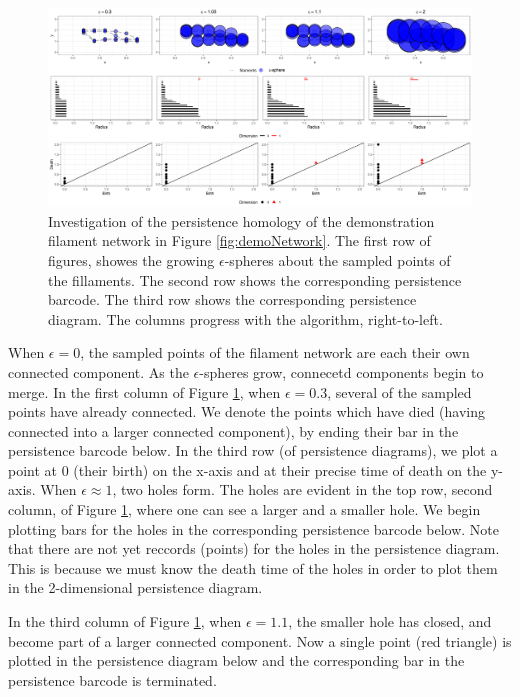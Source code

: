 \documentclass[10pt]{article}
\begin{document}
\begin{figure}[H]
	\begin{center}
		\includegraphics[width=1\textwidth]{figures/filaments_rips.png}
	\end{center}
	\caption{Investigation of the persistence homology of the demonstration filament network in Figure \ref{fig:demoNetwork}. The first row of figures, showes the growing $\epsilon$-spheres about the sampled points of the fillaments. The second row shows the corresponding persistence barcode. The third row shows the corresponding persistence diagram. The columns progress with the algorithm, right-to-left.}
	\label{fig:persistencediagram}
\end{figure}

When $\epsilon=0$, the sampled points of the filament network are each their own connected component. As the $\epsilon$-spheres grow, connecetd components begin to merge. In the first column of Figure \ref{fig:persistencediagram}, when $\epsilon=0.3$, several of the sampled points have already connected. We denote the points which have died (having connected into a larger connected component), by ending their bar in the persistence barcode below. In the third row (of persistence diagrams), we plot a point at 0 (their birth) on the x-axis and at their precise time of death on the y-axis. When $\epsilon\approx1$, two holes form. The holes are evident in the top row, second column, of Figure \ref{fig:persistencediagram}, where one can see a larger and a smaller hole. We begin plotting bars for the holes in the corresponding persistence barcode below. Note that there are not yet reccords (points) for the holes in the persistence diagram. This is because we must know the death time of the holes in order to plot them in the 2-dimensional persistence diagram. 

In the third column of Figure \ref{fig:persistencediagram}, when $\epsilon=1.1$, the smaller hole has closed, and become part of a larger connected component. Now a single point (red triangle) is plotted in the persistence diagram below and the corresponding bar in the persistence barcode is terminated.
\end{document}
